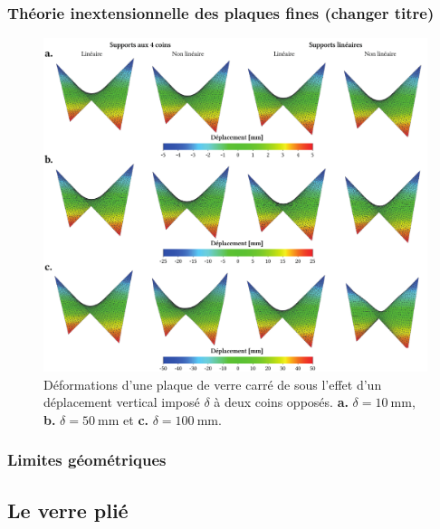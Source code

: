 \documentclass[11pt,titlepage]{article}
\begin{document}
\subsubsection{Théorie inextensionnelle des plaques fines (changer titre)}

\begin{figure}[H]
\centering
\includegraphics[width=\textwidth]{img/cintrage_froid/non_linear.pdf}
\caption{Déformations d'une plaque de verre carré de  sous l'effet d'un déplacement vertical imposé $\delta$ à deux coins opposés. \textbf{a.} $\delta = \qty{10}{\milli\metre}$, \textbf{b.} $\delta = \qty{50}{\milli\metre}$ et \textbf{c.} $\delta = \qty{100}{\milli\metre}$.}
\label{fig:non_linear_cintr}
\end{figure}

\cite{buckling_cold}
\subsubsection{Limites géométriques}

\subsection{Le verre plié}
\newpage
\end{document}
